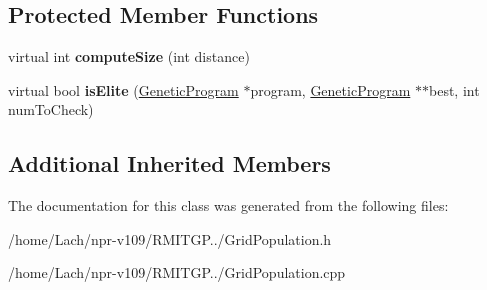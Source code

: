 \subsection*{Protected Member Functions}
\begin{DoxyCompactItemize}
\item 
\hypertarget{classGridPopulation_ab787bde0136b7fefc3eeabdf4f416676}{}\label{classGridPopulation_ab787bde0136b7fefc3eeabdf4f416676} 
virtual int {\bfseries compute\+Size} (int distance)
\item 
\hypertarget{classGridPopulation_a2a48584c03e41711526cd0825c6e0169}{}\label{classGridPopulation_a2a48584c03e41711526cd0825c6e0169} 
virtual bool {\bfseries is\+Elite} (\hyperlink{classGeneticProgram}{Genetic\+Program} $\ast$program, \hyperlink{classGeneticProgram}{Genetic\+Program} $\ast$$\ast$best, int num\+To\+Check)
\end{DoxyCompactItemize}
\subsection*{Additional Inherited Members}


The documentation for this class was generated from the following files\+:\begin{DoxyCompactItemize}
\item 
/home/\+Lach/npr-\/v109/\+R\+M\+I\+T\+G\+P../Grid\+Population.\+h\item 
/home/\+Lach/npr-\/v109/\+R\+M\+I\+T\+G\+P../Grid\+Population.\+cpp\end{DoxyCompactItemize}
